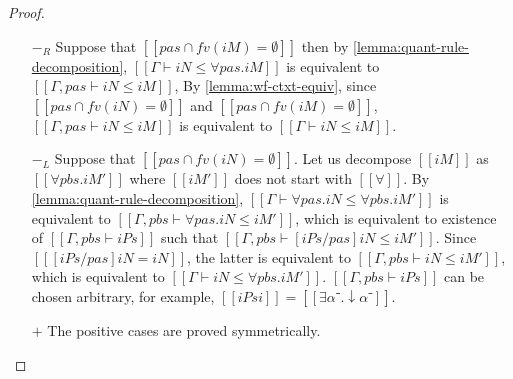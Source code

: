 \corollaryRedQuantElim*
\begin{proof}
  \begin{itemize}
    \item [$-_{R}$] Suppose that $[[ {pas} ∩ fv(iM) = ∅]]$ then 
      by \cref{lemma:quant-rule-decomposition},
      $[[Γ ⊢ iN ≤ ∀pas.iM]]$ 
      is equivalent to $[[Γ, pas ⊢ iN ≤ iM]]$,
      By \cref{lemma:wf-ctxt-equiv},
      since $[[{pas} ∩ fv(iN) = ∅]]$ and $[[{pas} ∩ fv(iM) = ∅]]$,
      $[[Γ, pas ⊢ iN ≤ iM]]$ is equivalent to $[[Γ ⊢ iN ≤ iM]]$.

    \item [$-_{L}$] Suppose that $[[ {pas} ∩ fv(iN) = ∅]]$.
      Let us decompose $[[iM]]$ as $[[∀pbs.iM']]$ 
      where $[[iM']]$ does not start with $[[∀]]$.
      By \cref{lemma:quant-rule-decomposition},
      $[[Γ ⊢ ∀pas.iN ≤ ∀pbs.iM']]$ is equivalent to
      $[[Γ,pbs ⊢ ∀pas.iN ≤ iM']]$, 
      which is equivalent to 
      existence of $[[Γ,pbs ⊢ iPs]]$ such that 
      $[[Γ,pbs ⊢ [iPs/pas]iN ≤ iM']]$.
      Since $[[ [iPs/pas]iN  = iN]]$, the latter is equivalent to 
      $[[Γ,pbs ⊢ iN ≤ iM']]$,
      which is equivalent to $[[Γ ⊢ iN ≤ ∀pbs.iM']]$.
      $[[Γ,pbs ⊢ iPs]]$ can be chosen arbitrary, for example, $[[iPsi]] = [[∃α⁻.↓α⁻]]$.
    \item [$+$] The positive cases are proved symmetrically.
  \end{itemize}
\end{proof}

